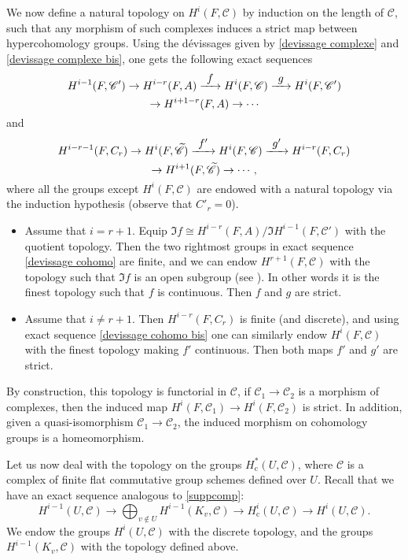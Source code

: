 \documentclass[JEP,XML,SOM,Unicode, NoEqCountersInSection]{cedram}
\let\mathcal\mathscr
\newcommand\To[1]{\mathchoice{\xrightarrow{\textstyle\kern4pt#1\kern3pt}}{\stackrel{#1}{\longrightarrow}}{}{}}
\newcommand{\rc}{\mathrm{c}}
\theoremstyle{plain}
\theoremstyle{definition}
\newcommand \cC {\mathcal{C}}
\begin{document}
We now define a natural topology on $H^i(F, \cC)$ by induction on the length of $\cC$, such that any morphism of such complexes induces a strict map between hypercohomology groups. Using the dévissages given by \eqref{devissage complexe} and \eqref{devissage complexe bis}, one gets the following exact sequences\vspace*{-3pt}
\begin{multline} \label{devissage cohomo}
H^{i-1}(F, \cC') \to H^{i-r}(F,A) \To{f} H^i(F, \cC) \To{g} H^i(F, \cC')\\ \to H^{i+1-r}(F,A) \to \cdots\vspace*{-3pt}
\end{multline}
and\vspace*{-3pt}
\begin{multline} \label{devissage cohomo bis}
H^{i-r-1}(F, C_r) \to H^{i}(F,\widetilde{\cC}) \To{f'} H^i(F, \cC) \To{g'} H^{i-r}(F, C_r)\\ \to H^{i+1}(F,\widetilde{\cC}) \to \cdots,\vspace*{-3pt}
\end{multline}
where all the groups except $H^i(F, \cC)$ are endowed with a
natural topology via the induction hypothesis (observe that $C'_r=0$).
\begin{itemize}
\item Assume that $i = r+1$. Equip $\Im f\cong H^{i-r}(F,A)/
\Im H^{i-1}(F, \cC')$ with the quotient topology.
Then the two rightmost groups in exact sequence \eqref{devissage cohomo} are finite, and we can endow $H^{r+1}(F, \cC)$ with the topology such that
$\Im f$ is an open subgroup (see \cite[beginning of \S 3]{DemH}).
In other words it is the
finest topology such that $f$ is continuous. Then $f$ and $g$ are strict.
\item Assume that $i \neq r+1$. Then $H^{i-r}(F,C_r)$ is finite (and discrete), and using exact sequence \eqref{devissage cohomo bis} one can similarly
endow $H^i(F, \cC)$ with the finest topology making $f'$ continuous. Then both maps $f'$ and $g'$ are strict.
\end{itemize}
By construction, this topology is functorial in $\cC$, \ie if $\cC_1 \to \cC_2$ is a morphism of complexes, then the induced map $H^i(F, \cC_1) \to H^i(F, \cC_2)$ is strict. In addition, given a quasi-isomorphism $\cC_1 \to \cC_2$, the induced morphism on cohomology groups is a homeomorphism.

Let us now deal with the topology on the groups $H^*_\rc(U, \cC)$, where $\cC$ is a complex of finite flat commutative group schemes defined over $U$. Recall that we have an exact sequence analogous to \eqref{suppcomp}:
\begin{equation} \label{long exact seq compact supp}
H^{i-1}(U,\cC) \to \bigoplus_{v \notin U} H^{i-1}(K_v,\cC) \to H^{i}_\rc(U,\cC) \to H^{i}(U,\cC).
\end{equation}
We endow the groups $H^{i}(U,\!\cC)$ with the discrete topology, and the groups~$H^{i-1}(K_v,\!\cC)$ with the topology defined above.
\end{document}
